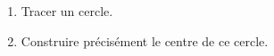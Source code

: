 
\begin{enumerate}
\item Tracer un cercle.
\item Construire précisément le centre de ce cercle.
\end{enumerate}

